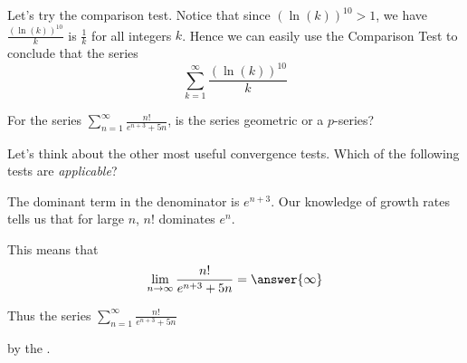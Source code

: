\documentclass{ximera}
\begin{document}
\begin{exercise}
\begin{hint}
\begin{question}
Let's try the comparison test.  Notice that since $(\ln(k))^{10}>1$, we have
$\frac{(\ln(k))^{10}}{k}$ is   $\frac{1}{k}$ for all integers $k$.  
Hence we can easily use the Comparison Test to conclude that the series
\[
\sum^{\infty}_{k=1} \frac{ (\ln(k))^{10}}{k}
\]

\begin{multipleChoice}
\end{multipleChoice}


\end{question}



\begin{question}
For the series $\sum_{n=1}^{\infty}  \frac{n!}{e^{n+3}+5n}$, is the series geometric or a $p$-series?

\begin{multipleChoice}
\end{multipleChoice}

Let's think about the other most useful convergence tests.  Which of the following tests are \emph{applicable}?

\begin{selectAll}
\end{selectAll}

The dominant term in the denominator is $e^{n+3}$. Our knowledge of growth rates tells us 
that for large $n$,  $n!$ dominates $e^n$. 

This means that 
\[
\lim_{n \to \infty} \frac{n!}{e^{n+3}+5n}=\answer{ \infty}
\]

Thus the series $\sum^{\infty}_{n=1} \frac{n!}{e^{n+3}+5n}$

by the
.


\end{question}


\end{hint}
\end{exercise}
\end{document}
